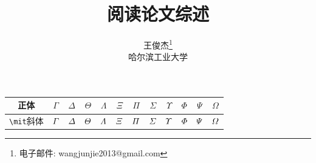 \documentclass[a4paper, 11pt]{article}
\newcommand{\xiaosihao}{\fontsize{12pt}{\baselineskip}\selectfont}
\begin{document}
\begin{CJK}{UTF8}{gbsn}

\newtheorem{example}{例}             %
\newtheorem{algorithm}{算法}
\newtheorem{theorem}{定理}[section]  %
\newtheorem{definition}{定义}
\newtheorem{axiom}{公理}
\newtheorem{property}{性质}
\newtheorem{proposition}{命题}
\newtheorem{lemma}{引理}
\newtheorem{corollary}{推论}
\newtheorem{remark}{注解}
\newtheorem{condition}{条件}
\newtheorem{conclusion}{结论}
\newtheorem{assumption}{假设}

\renewcommand{\contentsname}{目录}  %
\renewcommand{\abstractname}{摘要}  %
\renewcommand{\refname}{参考文献}   %
\renewcommand{\indexname}{索引}
\renewcommand{\figurename}{图}
\renewcommand{\tablename}{表}
\renewcommand{\appendixname}{附录}
\renewcommand{\algorithm}{算法}


\title{ 阅读论文综述}
\author{王俊杰\footnote{电子邮件: wangjunjie2013@gmail.com}\\[2ex]
\xiaosihao 哈尔滨工业大学\\[2ex]
}
\date{}


\maketitle


 \begin{tabular}{|c|ccccccccccc|}
\hline
正体&$\Gamma$ & $\Delta$ & $\Theta$ & $\Lambda$ & $\Xi$ & $\Pi$ & $\Sigma$ & $\Upsilon$ & $\Phi$ & $\Psi$ & $\Omega$\\
\hline
\verb|\mit|斜体&$\mit\Gamma$ & $\mit\Delta$ & $\mit\Theta$ & $\mit\Lambda$ & $\mit\Xi$ & $\mit\Pi$ & $\mit\Sigma$ &  $\mit\Upsilon$ & $\mit\Phi$ & $\mit\Psi$ & $\mit\Omega$\\
\hline
\end{tabular}



\end{CJK}
\end{document}
